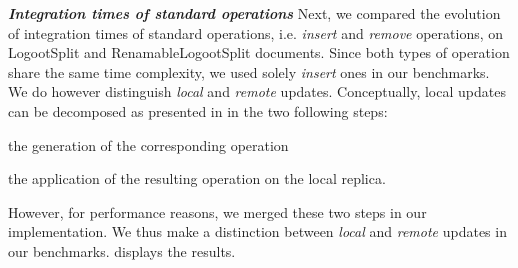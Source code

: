 \documentclass[10pt,journal,compsoc]{IEEEtran}
\newcommand{\ie}{i.e. }
\newcommand{\headerparagraph}[1]{\textbf{\emph{#1}}\quad}
\begin{document}
\headerparagraph{Integration times of standard operations}
%
Next, we compared the evolution of integration times of standard operations, \ie \emph{insert} and \emph{remove} operations, on LogootSplit and RenamableLogootSplit documents.
Since both types of operation share the same time complexity, we used solely \emph{insert} ones in our benchmarks.
We do however distinguish \emph{local} and \emph{remote} updates.
Conceptually, local updates can be decomposed as presented in \cite{baquero2017pure} in the two following steps:
\begin{enumerate*}[label=(\roman*)]
    \item the generation of the corresponding operation
    \item the application of the resulting operation on the local replica.
\end{enumerate*}
However, for performance reasons, we merged these two steps in our implementation.
We thus make a distinction between \emph{local} and \emph{remote} updates in our benchmarks.
 displays the results.
\end{document}

